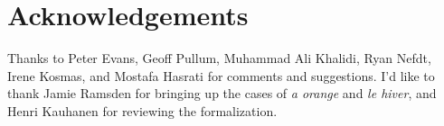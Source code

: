 \documentclass[12pt,letterpaper]{article}
\newcommand{\mention}[1]{\textit{#1}}
\newcommand{\olang}[1]{\textit{#1}}
\begin{document}
\newpage
\section*{Acknowledgements}
Thanks to Peter Evans, Geoff Pullum, Muhammad Ali Khalidi, Ryan Nefdt, Irene Kosmas, and Mostafa Hasrati for comments and suggestions. I'd like to thank Jamie Ramsden for bringing up the cases of \mention{a orange} and \olang{le hiver}, and Henri Kauhanen for reviewing the formalization.

\clearpage
\begin{sloppypar}
\printbibliography[title=References]
\end{sloppypar}
\end{document}
